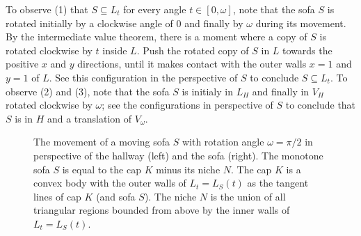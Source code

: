 To observe (1) that \(S \subseteq L_t\) for every angle \(t \in [0, \omega]\), note that the sofa \(S\) is rotated initially by a clockwise angle of \(0\) and finally by \(\omega\) during its movement. By the intermediate value theorem, there is a moment where a copy of \(S\) is rotated clockwise by \(t\) inside \(L\). Push the rotated copy of \(S\) in \(L\) towards the positive \(x\) and \(y\) directions, until it makes contact with the outer walls \(x=1\) and \(y=1\) of \(L\). See this configuration in the perspective of \(S\) to conclude \(S \subseteq L_t\). To observe (2) and (3), note that the sofa \(S\) is initialy in \(L_H\) and finally in \(V_H\) rotated clockwise by \(\omega\); see the configurations in perspective of \(S\) to conclude that \(S\) is in \(H\) and a translation of \(V_\omega\).

\begin{figure}
\centering

\caption{The movement of a moving sofa \(S\) with rotation angle \(\omega = \pi/2\) in perspective of the hallway (left) and the sofa (right). The monotone sofa \(S\) is equal to the cap \(K\) minus its niche \(N\). The cap \(K\) is a convex body with the outer walls of \(L_t = L_S(t)\) as the tangent lines of cap \(K\) (and sofa \(S\)). The niche \(N\) is the union of all triangular regions bounded from above by the inner walls of \(L_t = L_S(t)\).}
\label{fig:monotone-sofa}
\end{figure}

